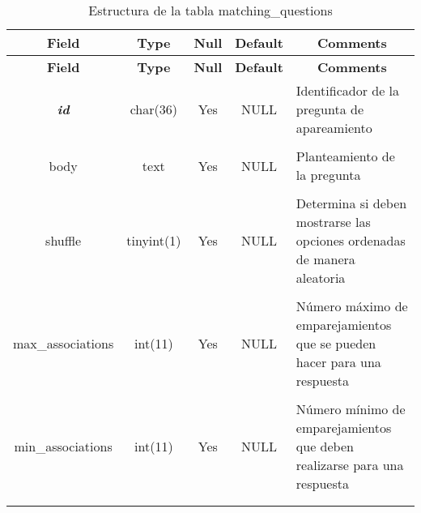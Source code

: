 %
%
\begin{longtable}{c c c c l}
	\multicolumn{1}{c}{\textbf{Field}} &
	\multicolumn{1}{c}{\textbf{Type}} &
	\multicolumn{1}{c}{\textbf{Null}} &
	\multicolumn{1}{c}{\textbf{Default}} &
	\multicolumn{1}{c}{\textbf{Comments}} \\ \hline \hline
\endfirsthead
	\multicolumn{1}{c}{\textbf{Field}} &
	\multicolumn{1}{c}{\textbf{Type}} &
	\multicolumn{1}{c}{\textbf{Null}} &
	\multicolumn{1}{c}{\textbf{Default}} &
	\multicolumn{1}{c}{\textbf{Comments}} \\ \hline \hline
\endhead \endfoot
	\textbf{\textit{id}} & char(36) & Yes & NULL & \parbox[t]{0.35\textwidth}{Identificador de la pregunta de apareamiento} \\ \\  \hline
	body & text & Yes & NULL & \parbox[t]{0.35\textwidth}{Planteamiento de la pregunta} \\ \\  \hline
	shuffle & tinyint(1) & Yes & NULL & \parbox[t]{0.35\textwidth}{Determina si deben mostrarse las opciones ordenadas de manera aleatoria} \\ \\  \hline
	max\_associations & int(11) & Yes & NULL & \parbox[t]{0.35\textwidth}{Número máximo de emparejamientos que se pueden hacer para una respuesta} \\ \\  \hline
	min\_associations & int(11) & Yes & NULL & \parbox[t]{0.35\textwidth}{Número mínimo de emparejamientos que deben realizarse para una respuesta} \\ \\ 
\caption{Estructura de la tabla matching\_questions} \label{tab:quiz_matching_questions-structure} \\ 
\end{longtable}

